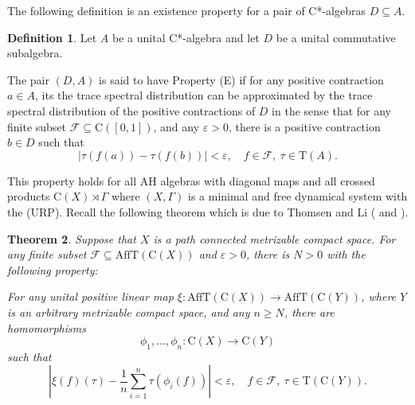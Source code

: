 \documentclass[12pt, oneside, psamsfonts]{amsart}
\newtheorem{thm}{Theorem}[section]
\theoremstyle{definition}
\newtheorem{defn}[thm]{Definition}
\theoremstyle{remark}
\numberwithin{equation}{section}
\newcommand{\norm}[1]{\| #1\|}
\newcommand{\abs}[1]{| #1 |}
\newcommand{\Comp}{\mathbb C}
\newcommand{\eps}{\varepsilon}
\newcommand{\tr}{\mathrm{T}}
\begin{document}



The following definition is an existence property for a pair of C*-algebras $D \subseteq A$.

\begin{defn}\label{defn-D}
Let $A$ be a unital C*-algebra and let $D$ be a unital commutative subalgebra. 

The pair $(D, A)$ is said to have Property (E) if for any positive contraction $a \in A$, its the trace spectral distribution can be approximated by the trace spectral distribution of the positive contractions of $D$ in the sense that for any finite subset $\mathcal F \subseteq \mathrm{C}([0, 1])$, and any $\eps>0$, there is a positive contraction $b \in D$ such that
$$ \abs{ \tau(f(a)) - \tau(f(b))} < \eps,\quad f \in \mathcal F,\ \tau \in \tr(A).$$
\end{defn}


This property holds for all AH algebras with diagonal maps and all crossed products $\mathrm{C}(X) \rtimes \Gamma$ where $(X, \Gamma)$ is a minimal and free dynamical system with the (URP). Recall the following theorem which is due to Thomsen and Li (\cite{Thomsen-AI-Tr} and \cite{Li-interval}).
\begin{thm}\label{Thomsen-Li}
Suppose that $X$ is a path connected metrizable compact space. For any finite subset $\mathcal F \subseteq \mathrm{Aff}\mathrm{T}(\mathrm{C}(X))$ and $\eps>0$, there is $N > 0$ with the following property:

For any unital positive linear map $\xi: \mathrm{Aff}\mathrm{T}(\mathrm{C}(X)) \to \mathrm{Aff}\mathrm{T}(\mathrm{C}(Y))$, where $Y$ is an arbitrary metrizable compact space, and any $n\geq N$, there are homomorphisms 
$$ \phi_1, ..., \phi_n: \mathrm{C}(X) \to  \mathrm{C}(Y) $$
such that
$$\abs{\xi(f)(\tau) -  \frac{1}{n} \sum_{i=1}^n \tau(\phi_i(f)) } < \eps,\quad f \in \mathcal F,\ \tau \in \mathrm{T}(\mathrm{C}(Y)). $$
\end{thm}
\end{document}
